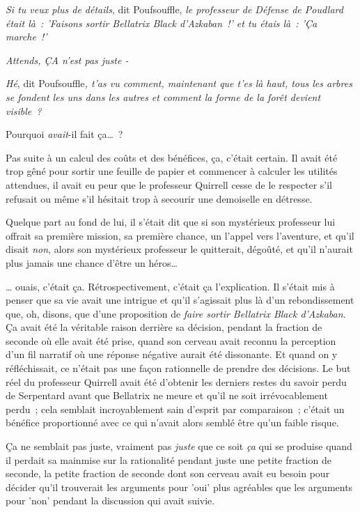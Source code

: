 \emph{Si tu veux plus de détails}, dit Poufsouffle, \emph{le professeur de Défense de Poudlard était là~: 'Faisons sortir Bellatrix Black d'Azkaban~!' et tu étais là~: 'Ça marche~!'}

\emph{Attends, ÇA n'est pas juste -}

\emph{Hé}, dit Poufsouffle\emph{, t'as vu comment, maintenant que t'es là haut, tous les arbres se fondent les uns dans les autres et comment la forme de la forêt devient visible~?}

Pourquoi \emph{avait}-il fait ça…~?

Pas suite à un calcul des coûts et des bénéfices, ça, c'était certain. Il avait été trop gêné pour sortir une feuille de papier et commencer à calculer les utilités attendues, il avait eu peur que le professeur Quirrell cesse de le respecter s'il refusait ou même s'il hésitait trop à secourir une demoiselle en détresse.

Quelque part au fond de lui, il s'était dit que si son mystérieux professeur lui offrait sa première mission, sa première chance, un l'appel vers l'aventure, et qu'il disait \emph{non}, alors son mystérieux professeur le quitterait, dégoûté, et qu'il n'aurait plus jamais une chance d'être un héros…

… ouais, c'était ça. Rétrospectivement, c'était ça l'explication. Il s'était mis à penser que sa vie avait une intrigue et qu'il s'agissait plus là d'un rebondissement que, oh, disons, que d'une proposition de \emph{faire sortir Bellatrix Black d'Azkaban.} Ça avait été la véritable raison derrière sa décision, pendant la fraction de seconde où elle avait été prise, quand son cerveau avait reconnu la perception d'un fil narratif où une réponse négative aurait été dissonante. Et quand on y réfléchissait, ce n'était pas une façon rationnelle de prendre des décisions. Le but réel du professeur Quirrell avait été d'obtenir les derniers restes du savoir perdu de Serpentard avant que Bellatrix ne meure et qu'il ne soit irrévocablement perdu~; cela semblait incroyablement sain d'esprit par comparaison~; c'était un bénéfice proportionné avec ce qui n'avait alors semblé être qu'un faible risque.

Ça ne semblait pas juste, vraiment pas \emph{juste} que ce soit \emph{ça} qui se produise quand il perdait sa mainmise sur la rationalité pendant juste une petite fraction de seconde, la petite fraction de seconde dont son cerveau avait eu besoin pour décider qu'il trouverait les arguments pour 'oui' plus agréables que les arguments pour 'non' pendant la discussion qui avait suivie.

